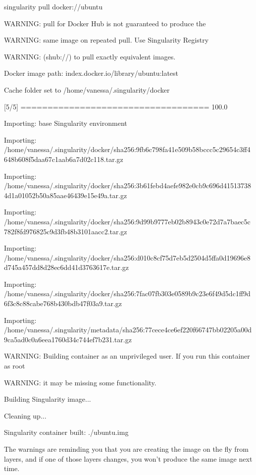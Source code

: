 \documentclass[letterpaper,10pt,english]{sphinxmanual}
\begin{document}
%
\begin{sphinxVerbatim}[commandchars=\\\{\}]
singularity pull docker://ubuntu

WARNING: pull for Docker Hub is not guaranteed to produce the

WARNING: same image on repeated pull. Use Singularity Registry

WARNING: (shub://) to pull exactly equivalent images.

Docker image path: index.docker.io/library/ubuntu:latest

Cache folder set to /home/vanessa/.singularity/docker

[5/5] \textbar{}===================================\textbar{} 100.0\PYGZpc{}

Importing: base Singularity environment

Importing: /home/vanessa/.singularity/docker/sha256:9fb6c798fa41e509b58bccc5c29654c3ff4648b608f5daa67c1aab6a7d02c118.tar.gz

Importing: /home/vanessa/.singularity/docker/sha256:3b61febd4aefe982e0cb9c696d415137384d1a01052b50a85aae46439e15e49a.tar.gz

Importing: /home/vanessa/.singularity/docker/sha256:9d99b9777eb02b8943c0e72d7a7baec5c782f8fd976825c9d3fb48b3101aacc2.tar.gz

Importing: /home/vanessa/.singularity/docker/sha256:d010c8cf75d7eb5d2504d5ffa0d19696e8d745a457dd8d28ec6dd41d3763617e.tar.gz

Importing: /home/vanessa/.singularity/docker/sha256:7fac07fb303e0589b9c23e6f49d5dc1ff9d6f3c8c88cabe768b430bdb47f03a9.tar.gz

Importing: /home/vanessa/.singularity/metadata/sha256:77cece4ce6ef220f66747bb02205a00d9ca5ad0c0a6eea1760d34c744ef7b231.tar.gz

WARNING: Building container as an unprivileged user. If you run this container as root

WARNING: it may be missing some functionality.

Building Singularity image...

Cleaning up...

Singularity container built: ./ubuntu.img
\end{sphinxVerbatim}

The warnings are reminding you that you are creating the
image on the fly from layers, and if one of those layers changes, you
won’t produce the same image next time.
\end{document}
